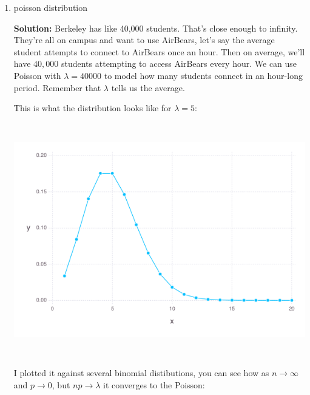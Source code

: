 \documentclass{article}
\newenvironment{solution}{

            \color{blue} \smallskip \textbf{Solution:}}{}
\begin{document}
\begin{enumerate}
\begin{enumerate}
            \item poisson distribution
            \begin{solution}
                Berkeley has like 40,000 students. That's close enough to infinity. They're all on campus and want to use AirBears, let's say the average student attempts to connect
                to AirBears once an hour. Then on average, we'll have $40,000$ students attempting to access AirBears every hour. We can use Poisson with $\lambda = 40000$ to model how
                many students connect in an hour-long period. Remember that $\lambda$ tells us the average.
                
                This is what the distribution looks like for $\lambda=5$:

                \includegraphics[height=4in,width=6in]{poisson_plot.png}

                I plotted it against several binomial distibutions, you can see how as $n \rightarrow \infty$ and $p \rightarrow 0$, but $np \rightarrow \lambda$ it converges to the Poisson:


\end{solution}
\end{enumerate}
\end{enumerate}
\end{document}
